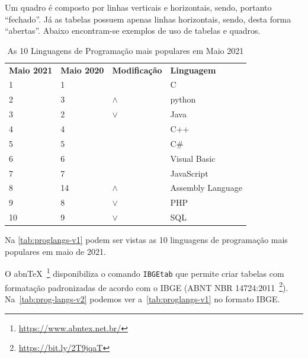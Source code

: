 \documentclass[
	12pt,    %
	oneside, %
	a4paper, %
	chapter=TITLE, %
	section=TITLE, %
	sumario=tradicional, %
	english, %
	brazil   %
] {abntex2}
\begin{document}
Um quadro é composto por linhas verticais e horizontais, sendo, portanto \enquote{fechado}. Já as tabelas possuem apenas linhas horizontais, sendo, desta forma \enquote{abertas}. Abaixo encontram-se exemplos de uso de tabelas e quadros.
	
	
	\begin{table}[!htb]
		\centering
		\caption{As 10 Linguagens de Programação mais populares em Maio 2021}
		\label{tab:proglangs-v1}
		\vspace{3mm}
		\begin{tabular}{@{}llll@{}}
			\toprule[.1em]
			\textbf{Maio 2021}	& \textbf{Maio 2020}	& \textbf{Modificação}	& \textbf{Linguagem}\\
			\cmidrule{1-4}
					1			& 1     				&        					& C \\
					2			& 3     				& {\color{green}$\wedge$}	& python \\
					3			& 2     				& {\color{red}$\vee$}		& Java \\
					4			& 4     				& 							& C++ \\
					5			& 5     				& 							& C\# \\
					6			& 6     				& 							& Visual Basic \\
					7			& 7     				& 							& JavaScript \\
					8			& 14     				& {\color{green}$\wedge$}	& Assembly Language \\
					9			& 8     				& {\color{red}$\vee$}		& PHP \\				
					10			& 9     				& {\color{red}$\vee$}		& SQL \\				
			\bottomrule[.08em]
		\end{tabular}
	\end{table}
	
	Na \autoref{tab:proglangs-v1} podem ser vistas as 10 linguagens de programação mais populares em maio de 2021.	

	O abn\TeX~\footnote{\url{https://www.abntex.net.br/}} disponibiliza o comando \texttt{IBGEtab} que permite criar tabelas com formatação padronizadas de acordo com o IBGE (ABNT NBR 14724:2011~\footnote{\url{https://bit.ly/2T9jqaT}}). Na~\autoref{tab:prog-langs-v2} podemos ver a~\autoref{tab:proglangs-v1} no formato IBGE.
\end{document}
